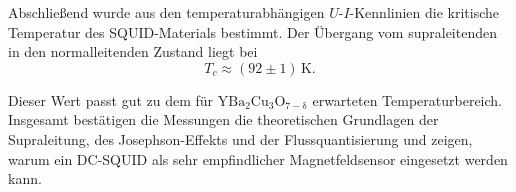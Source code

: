 \documentclass{article}
\begin{document}
Abschließend wurde aus den temperaturabhängigen $U$-$I$-Kennlinien die kritische Temperatur des SQUID-Materials bestimmt. Der Übergang vom supraleitenden in den normalleitenden Zustand liegt bei
\begin{equation}
    T_c \approx (92\pm1)\,\mathrm{K}.
\end{equation}

Dieser Wert passt gut zu dem für $\mathrm{YBa_2Cu_3O_{7-\delta}}$ erwarteten Temperaturbereich. Insgesamt bestätigen die Messungen die theoretischen Grundlagen der Supraleitung, des Josephson-Effekts und der Flussquantisierung und zeigen, warum ein DC-SQUID als sehr empfindlicher Magnetfeldsensor eingesetzt werden kann.

\newpage
\listoffigures
\listoftables

\printbibliography
\end{document}
